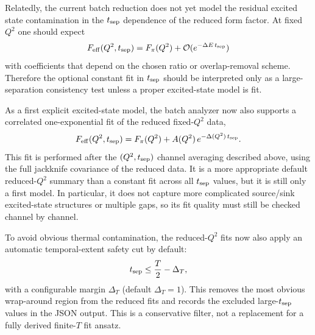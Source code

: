 \documentclass[11pt]{article}
\begin{document}
Relatedly, the current batch reduction does not yet model the residual excited
state contamination in the $t_{\rm sep}$ dependence of the reduced form factor.
At fixed $Q^2$ one should expect
\begin{equation}
  F_{\rm eff}(Q^2,t_{\rm sep})
  =
  F_\pi(Q^2)
  +
  \mathcal{O}(e^{-\Delta E\, t_{\rm sep}})
\end{equation}
with coefficients that depend on the chosen ratio or overlap-removal scheme.
Therefore the optional constant fit in $t_{\rm sep}$ should be interpreted only
as a large-separation consistency test unless a proper excited-state model is
fit.

As a first explicit excited-state model, the batch analyzer now also supports a
correlated one-exponential fit of the reduced fixed-$Q^2$ data,
\begin{equation}
  F_{\rm eff}(Q^2,t_{\rm sep})
  =
  F_\pi(Q^2)
  +
  A(Q^2)\,e^{-\Delta(Q^2)\,t_{\rm sep}}.
\end{equation}
This fit is performed after the $(Q^2,t_{\rm sep})$ channel averaging described
above, using the full jackknife covariance of the reduced data. It is a more
appropriate default reduced-$Q^2$ summary than a constant fit across all
$t_{\rm sep}$ values, but it is still only a first model. In particular, it
does not capture more complicated source/sink excited-state structures or
multiple gaps, so its fit quality must still be checked channel by channel.

To avoid obvious thermal contamination, the reduced-$Q^2$ fits now also apply
an automatic temporal-extent safety cut by default:
\begin{equation}
  t_{\rm sep} \le \frac{T}{2} - \Delta_T,
\end{equation}
with a configurable margin $\Delta_T$ (default $\Delta_T=1$). This removes the
most obvious wrap-around region from the reduced fits and records the excluded
large-$t_{\rm sep}$ values in the JSON output. This is a conservative filter,
not a replacement for a fully derived finite-$T$ fit ansatz.
\end{document}
